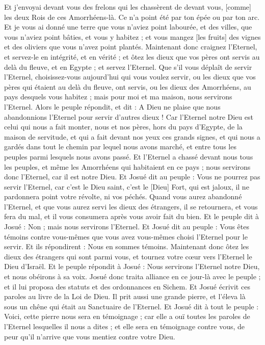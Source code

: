 \begin{multicols}{2}
Et j'envoyai devant vous des frelons qui les chassèrent de devant vous, [comme] les deux Rois de ces Amorrhéens-là. Ce n'a point été par ton épée ou par ton arc.
Et je vous ai donné une terre que vous n'aviez point labourée, et des villes, que vous n'aviez point bâties, et vous y habitez ; et vous mangez [les fruits] des vignes et des oliviers que vous n'avez point plantés.
Maintenant donc craignez l'Eternel, et servez-le en intégrité, et en vérité ; et ôtez les dieux que vos pères ont servis au delà du fleuve, et en Egypte ; et servez l'Eternel.
Que s'il vous déplaît de servir l'Eternel, choisissez-vous aujourd'hui qui vous voulez servir, ou les dieux que vos pères qui étaient au delà du fleuve, ont servis, ou les dieux des Amorrhéens, au pays desquels vous habitez ; mais pour moi et ma maison, nous servirons l'Eternel.
Alors le peuple répondit, et dit : A Dieu ne plaise que nous abandonnions l'Eternel pour servir d'autres dieux !
Car l'Eternel notre Dieu est celui qui nous a fait monter, nous et nos pères, hors du pays d'Egypte, de la maison de servitude, et qui a fait devant nos yeux ces grands signes, et qui nous a gardés dans tout le chemin par lequel nous avons marché, et entre tous les peuples parmi lesquels nous avons passé.
Et l'Eternel a chassé devant nous tous les peuples, et même les Amorrhéens qui habitaient en ce pays ; nous servirons donc l'Eternel, car il est notre Dieu.
Et Josué dit au peuple : Vous ne pourrez pas servir l'Eternel, car c'est le Dieu saint, c'est le [Dieu] Fort, qui est jaloux, il ne pardonnera point votre révolte, ni vos péchés.
Quand vous aurez abandonné l'Eternel, et que vous aurez servi les dieux des étrangers, il se retournera, et vous fera du mal, et il vous consumera après vous avoir fait du bien.
Et le peuple dit à Josué : Non ; mais nous servirons l'Eternel.
Et Josué dit au peuple : Vous êtes témoins contre vous-mêmes que vous avez vous-mêmes choisi l'Eternel pour le servir. Et ils répondirent : Nous en sommes témoins.
Maintenant donc ôtez les dieux des étrangers qui sont parmi vous, et tournez votre cœur vers l'Eternel le Dieu d'Israël.
Et le peuple répondit à Josué : Nous servirons l'Eternel notre Dieu, et nous obéirons à sa voix.
Josué donc traita alliance en ce jour-là avec le peuple ; et il lui proposa des statuts et des ordonnances en Sichem.
Et Josué écrivit ces paroles au livre de la Loi de Dieu. Il prit aussi une grande pierre, et l'éleva là sous un chêne qui était au Sanctuaire de l'Eternel.
Et Josué dit à tout le peuple : Voici, cette pierre nous sera en témoignage ; car elle a ouï toutes les paroles de l'Eternel lesquelles il nous a dites ; et elle sera en témoignage contre vous, de peur qu'il n'arrive que vous mentiez contre votre Dieu.

\end{multicols}
